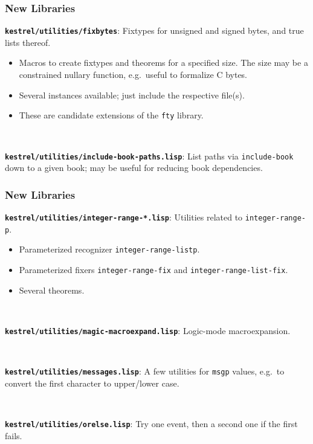 \documentclass{beamer}
\newcommand{\code}[1]{\texttt{#1}}
\newcommand{\bookpath}[1]{\textbf{\code{#1}}}
\newcommand{\newlibtitle}{\frametitle{New Libraries}}
\begin{document}

\begin{frame}

\newlibtitle

\bookpath{kestrel/utilities/fixbytes}:
Fixtypes for unsigned and signed bytes, and true lists thereof.
\begin{itemize}
\item
Macros to create fixtypes and theorems for a specified size.
The size may be a constrained nullary function,
e.g.\ useful to formalize C bytes.
\item
Several instances available; just include the respective file(s).
\item
These are candidate extensions of the \code{fty} library.
\end{itemize}

\

\bookpath{kestrel/utilities/include-book-paths.lisp}:
List paths via \code{include-book} down to a given book; may be useful
for reducing book dependencies.

\end{frame}


\begin{frame}

\newlibtitle

\bookpath{kestrel/utilities/integer-range-*.lisp}:
Utilities related to \code{integer-range-p}.
\begin{itemize}
\item
Parameterized recognizer \code{integer-range-listp}.
\item
Parameterized fixers
\code{integer-range-fix} and \code{integer-range-list-fix}.
\item
Several theorems.
\end{itemize}

\

\bookpath{kestrel/utilities/magic-macroexpand.lisp}:
Logic-mode macroexpansion.

\

\bookpath{kestrel/utilities/messages.lisp}:
A few utilities for \code{msgp} values,
e.g.\ to convert the first character to upper/lower case.

\

\bookpath{kestrel/utilities/orelse.lisp}:
Try one event, then a second one if the first fails.

\end{frame}
\end{document}
